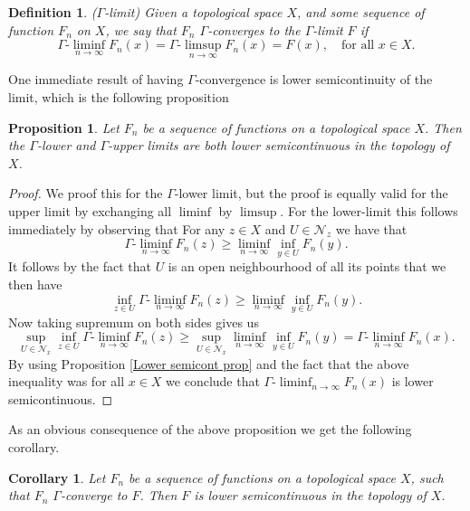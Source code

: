 \documentclass[a4paper,11pt]{article}
\newcommand{\Gliminf}{\Gamma\text{-}\liminf}
\newcommand{\Glimsup}{\Gamma\text{-}\limsup}
\newtheorem{definition}{Definition}
\newtheorem{proposition}{Proposition}
\newtheorem{corollary}{Corollary}
\numberwithin{equation}{section}
\begin{document}
\begin{definition}($ \Gamma $-limit)
		Given a topological space $ X $, and some sequence of function $ F_n $ on $ X $, we say that $ F_n $ $ \Gamma $-converges to the $ \Gamma $-limit $ F $ if \begin{equation}
		\Gliminf_{n\to\infty}F_n(x)=\Glimsup_{n\to\infty}F_n(x)=F(x),\quad\text{for all }x\in X.
		\end{equation}
\end{definition}
One immediate result of having $ \Gamma $-convergence is lower semicontinuity of the limit, which is the following proposition
\begin{proposition}\label{Gamma lower semicontinuity prop}
	Let $ F_n $ be a sequence of functions on a topological space $ X $. Then the $ \Gamma $-lower and $ \Gamma $-upper limits are both lower semicontinuous in the topology of $ X $.
\end{proposition}
\begin{proof}
	We proof this for the $ \Gamma $-lower limit, but the proof is equally valid for the upper limit by exchanging all $ \liminf $ by $ \limsup $.
		For the lower-limit this follows immediately by observing that For any $ z\in X $ and $ U\in \mathcal{N}_z $ we have that 
		$$ \Gliminf_{n\to\infty}F_n(z)\geq\liminf_{n\to\infty}\inf_{y\in U}F_n(y).  $$
		It follows by the fact that $ U $ is an open neighbourhood of all its points that we then have \begin{equation}
		\inf_{z\in U}\Gliminf_{n\to\infty}F_n(z)\geq\liminf_{n\to\infty}\inf_{y\in U}F_n(y).
		\end{equation}
		Now taking supremum on both sides gives us\begin{equation}
		\sup_{U\in\mathcal{N}_x}\inf_{z\in U}\Gliminf_{n\to\infty}F_n(z)\geq\sup_{U\in\mathcal{N}_x}\liminf_{n\to\infty}\inf_{y\in U}F_n(y)=\Gliminf_{n\to\infty}F_n(x).
		\end{equation}
		By using Proposition \ref{Lower semicont prop} and the fact that the above inequality was for all $ x\in X $ we conclude that $ \Gliminf_{n\to\infty}F_n(x) $ is lower semicontinuous.
\end{proof} 
As an obvious consequence of the above proposition we get the following corollary.
\begin{corollary}\label{Gamma-limit lower semicontinuity col}
	Let $ F_n $ be a sequence of functions on a topological space $ X $, such that $ F_n $ $ \Gamma $-converge to $ F $. Then $ F $ is lower semicontinuous in the topology of $ X $.
\end{corollary} 
\end{document}
